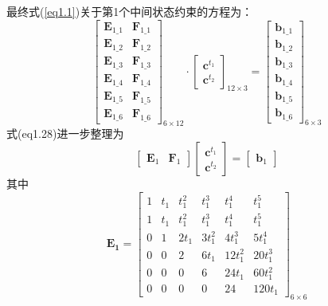 \documentclass[40pt,a4paper,UTF8,twocolumn]{ctexart}%
\numberwithin{equation}{section}
\begin{document}
\begin{enumerate}
    最终式(\ref{eq1.1})关于第1个中间状态约束的方程为：
    \begin{equation}
        \begin{bmatrix}
            \bm E_{1\_1} & \bm F_{1\_1} \\
            \bm E_{1\_2} & \bm F_{1\_2} \\
            \bm E_{1\_3} & \bm F_{1\_3} \\
            \bm E_{1\_4} & \bm F_{1\_4} \\
            \bm E_{1\_5} & \bm F_{1\_5} \\
            \bm E_{1\_6} & \bm F_{1\_6} 
        \end{bmatrix}_{6\times 12}
        \cdot 
        \begin{bmatrix}
            \bm c^{t_1}\\\bm c^{t_2}
        \end{bmatrix}_{12\times 3}
        =
        \begin{bmatrix}
            \bm b_{1\_1}\\
            \bm b_{1\_2}\\
            \bm b_{1\_3}\\
            \bm b_{1\_4}\\
            \bm b_{1\_5}\\
            \bm b_{1\_6}
        \end{bmatrix}_{6\times 3}
        \label{eq1.28}
    \end{equation}
式(eq1.28)进一步整理为
\begin{equation}
    \begin{bmatrix}
    \bm E_1 & \bm F_1
    \end{bmatrix}
    \begin{bmatrix}
        \bm c^{t_1}\\\bm c^{t_2}
    \end{bmatrix}
    =
    \begin{bmatrix}
        \bm b_1
    \end{bmatrix}
\end{equation}
其中
\begin{equation}
    \bm {E_1} = 
    \begin{bmatrix}
        1&t_1&t_1^2&t_1^3&t_1^4&t_1^5\\
        1&t_1&t_1^2&t_1^3&t_1^4&t_1^5\\
        0&1&2t_1&3t_1^2&4t_1^3&5t_1^4 \\
        0&0&2&6t_1&12t_1^2&20t_1^3 \\
        0&0&0&6&24t_1&60t_1^2 \\
        0&0&0&0&24&120t_1
    \end{bmatrix}_{6\times 6}
\end{equation}
    

\end{enumerate}
\end{document}

